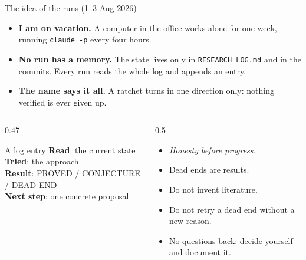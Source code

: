 \documentclass[11pt,aspectratio=169]{beamer}
\newcommand{\datei}[1]{\texttt{#1}}
\begin{document}
\begin{frame}{The idea of the runs (1--3 Aug 2026)}
  \begin{itemize}
  \item \textbf{I am on vacation.} A computer in the office works alone for one week,
    running \texttt{claude -p} every four hours.
  \item \textbf{No run has a memory.} The state lives only in \datei{RESEARCH\_LOG.md}
    and in the commits. Every run reads the whole log and appends an entry.
  \item \textbf{The name says it all.} A ratchet turns in one direction only: nothing
    verified is ever given up.
  \end{itemize}
  \medskip
  \begin{columns}[T]
    \begin{column}{0.47\textwidth}
      \begin{block}{A log entry}
        \footnotesize
        \textbf{Read}: the current state\\
        \textbf{Tried}: the approach\\
        \textbf{Result}: PROVED / CONJECTURE / DEAD END\\
        \textbf{Next step}: one concrete proposal
      \end{block}
    \end{column}
    \begin{column}{0.5\textwidth}
      \footnotesize
      \begin{itemize}
      \item \emph{Honesty before progress.}
      \item Dead ends are results.
      \item Do not invent literature.
      \item Do not retry a dead end without a new reason.
      \item No questions back: decide yourself and document it.
      \end{itemize}
    \end{column}
  \end{columns}
\end{frame}
\end{document}
